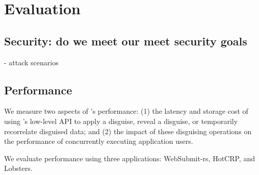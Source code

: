 \section{Evaluation}
\subsection{Security: do we meet our meet security goals}
   - attack scenarios

\subsection{Performance}

We measure two aspects of \sys's performance: (1) the latency and storage cost of using \sys's
low-level API to apply a disguise, reveal a disguise, or temporarily recorrelate disguised data; and
(2) the impact of these disguising operations on the performance of concurrently executing
application users.

We evaluate performance using three applications: WebSubmit-rs, HotCRP, and Lobsters.

